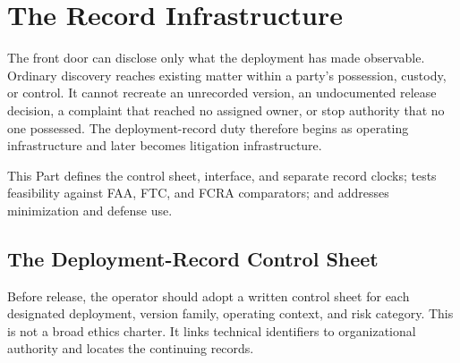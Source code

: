 \section{The Record Infrastructure}
\label{sec:infrastructure}

The front door can disclose only what the deployment has made observable. Ordinary discovery reaches existing matter within a party's possession, custody, or control. It cannot recreate an unrecorded version, an undocumented release decision, a complaint that reached no assigned owner, or stop authority that no one possessed. The deployment-record duty therefore begins as operating infrastructure and later becomes litigation infrastructure.

This Part defines the control sheet, interface, and separate record clocks; tests feasibility against FAA, FTC, and FCRA comparators; and addresses minimization and defense use.

\subsection{The Deployment-Record Control Sheet}

Before release, the operator should adopt a written control sheet for each designated deployment, version family, operating context, and risk category. This is not a broad ethics charter. It links technical identifiers to organizational authority and locates the continuing records.

